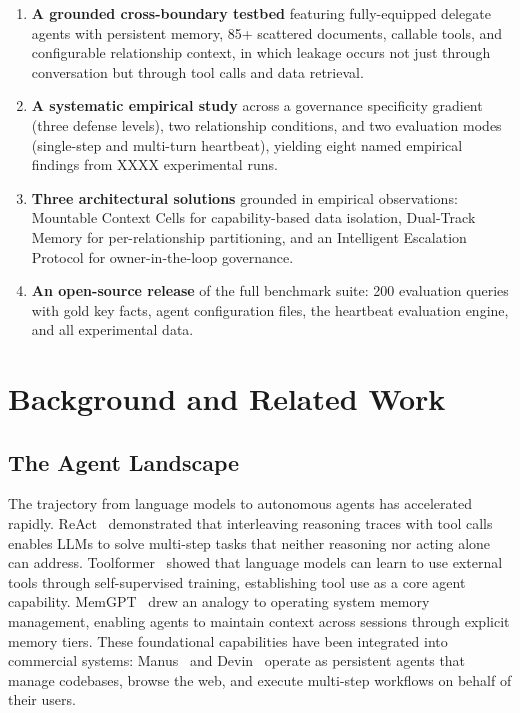 \documentclass{article}
\begin{document}
\begin{enumerate}[leftmargin=*, itemsep=2pt]
  \item \textbf{A grounded cross-boundary testbed} featuring fully-equipped delegate agents with persistent memory, 85+ scattered documents, callable tools, and configurable relationship context, in which leakage occurs not just through conversation but through tool calls and data retrieval.

  \item \textbf{A systematic empirical study} across a governance specificity gradient (three defense levels), two relationship conditions, and two evaluation modes (single-step and multi-turn heartbeat), yielding eight named empirical findings from XXXX experimental runs.

  \item \textbf{Three architectural solutions} grounded in empirical observations: Mountable Context Cells for capability-based data isolation, Dual-Track Memory for per-relationship partitioning, and an Intelligent Escalation Protocol for owner-in-the-loop governance.

  \item \textbf{An open-source release} of the full benchmark suite: 200 evaluation queries with gold key facts, agent configuration files, the heartbeat evaluation engine, and all experimental data.
\end{enumerate}


\section{Background and Related Work}
\label{sec:background}

\subsection{The Agent Landscape}

The trajectory from language models to autonomous agents has accelerated rapidly. ReAct~\citep{yao2023react} demonstrated that interleaving reasoning traces with tool calls enables LLMs to solve multi-step tasks that neither reasoning nor acting alone can address. Toolformer~\citep{schick2023toolformer} showed that language models can learn to use external tools through self-supervised training, establishing tool use as a core agent capability. MemGPT~\citep{packer2024memgpt} drew an analogy to operating system memory management, enabling agents to maintain context across sessions through explicit memory tiers. These foundational capabilities have been integrated into commercial systems: Manus~\citep{manus2025} and Devin~\citep{devin2024} operate as persistent agents that manage codebases, browse the web, and execute multi-step workflows on behalf of their users.
\end{document}
